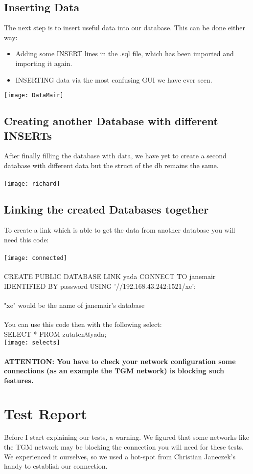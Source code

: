 \documentclass[11pt,a4paper]{article}
\begin{document}
\subsection{Inserting Data}
The next step is to insert useful data into our database. This can be done either way:
\begin{itemize}
	\item Adding some INSERT lines in the .sql file, which has been imported and importing it again.
	\item INSERTING data via the most confusing GUI we have ever seen.
\end{itemize}
\texttt{[image: DataMair]}
\subsection{Creating another Database with different INSERTs}
After finally filling the database with data, we have yet to create a second database with different data but the struct of the db remains the same. \\ \\
\texttt{[image: richard]}
\subsection{Linking the created Databases together}
To create a link which is able to get the data from another database you will need this code:\\ \\
\texttt{[image: connected]} \\ \\
CREATE PUBLIC DATABASE LINK yada
CONNECT TO janemair IDENTIFIED BY password
USING '//192.168.43.242:1521/xe';\\ \\
"xe" would be the name of janemair's database \\ \\
\newpage
You can use this code then with the following select:\\

SELECT * FROM zutaten@yada;\\

\texttt{[image: selects]} \\ \\
\textbf{ATTENTION: You have to check your network configuration some connections (as an example the TGM network) is blocking such features.} \\
\newpage

\section{Test Report}
Before I start explaining our tests, a warning. We figured that some networks like the TGM network may be blocking the connection you will need for these tests. We experienced it ourselves, so we used a hot-spot from Christian Janeczek's handy to establish our connection.\\
\end{document}
